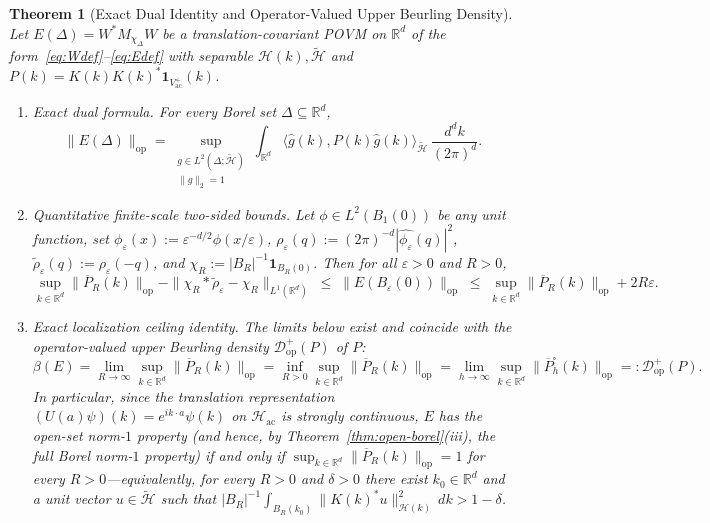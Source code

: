 \documentclass[11pt,a4paper]{article}
\newtheorem{theorem}{Theorem}[section]
\theoremstyle{definition}
\theoremstyle{remark}
\newcommand{\HH}{\mathcal{H}}
\newcommand{\tH}{\widetilde{\mathcal{H}}}
\newcommand{\RR}{\mathbb{R}}
\newcommand{\op}{\mathrm{op}}
\newcommand{\ac}{\mathrm{ac}}
\newcommand{\one}{\mathbf{1}}
\newcommand{\ip}[2]{\langle #1, #2 \rangle}
\newcommand{\norm}[1]{\|#1\|}
\begin{document}
\begin{theorem}[Exact Dual Identity and Operator-Valued Upper Beurling Density]\label{thm:beurling}
Let $E(\Delta)=W^* M_{\chi_\Delta} W$ be a translation-covariant POVM on $\RR^d$ of the form~\eqref{eq:Wdef}--\eqref{eq:Edef} with separable $\HH(k),\tH$ and $P(k)=K(k)K(k)^*\one_{V_\ac^+}(k)$.
\begin{enumerate}[label=\textup{(\roman*)},leftmargin=*]
\item \emph{Exact dual formula.} For every Borel set $\Delta\subseteq\RR^d$,
\begin{equation}\label{eq:dual}
\norm{E(\Delta)}_{\op} = \sup_{\substack{g\in L^2(\Delta;\tH)\\ \norm{g}_2=1}} \int_{\RR^d} \ip{\widehat{g}(k)}{P(k)\widehat{g}(k)}_{\tH}\,\frac{d^dk}{(2\pi)^d}.
\end{equation}
\item \emph{Quantitative finite-scale two-sided bounds.} Let $\phi\in L^2(B_1(0))$ be any unit function, set $\phi_\varepsilon(x):=\varepsilon^{-d/2}\phi(x/\varepsilon)$, $\rho_\varepsilon(q):=(2\pi)^{-d}|\widehat{\phi_\varepsilon}(q)|^2$, $\widetilde{\rho}_\varepsilon(q):=\rho_\varepsilon(-q)$, and $\chi_R := |B_R|^{-1}\one_{B_R(0)}$. Then for all $\varepsilon>0$ and $R>0$,
\begin{equation}\label{eq:sandwich}
\sup_{k\in\RR^d}\norm{\overline{P}_R(k)}_{\op} - \norm{\chi_R * \widetilde{\rho}_\varepsilon - \chi_R}_{L^1(\RR^d)}
\;\le\; \norm{E(B_\varepsilon(0))}_{\op}
\;\le\; \sup_{k\in\RR^d}\norm{\overline{P}_R(k)}_{\op} + 2R\varepsilon.
\end{equation}
\item \emph{Exact localization ceiling identity.} The limits below exist and coincide with the operator-valued upper Beurling density $\mathcal{D}_{\op}^+(P)$ of $P$:
\begin{equation}\label{eq:ceiling}
\beta(E) = \lim_{R\to\infty}\sup_{k\in\RR^d}\norm{\overline{P}_R(k)}_{\op}
= \inf_{R>0}\sup_{k\in\RR^d}\norm{\overline{P}_R(k)}_{\op}
= \lim_{h\to\infty}\sup_{k\in\RR^d}\norm{\overline{P}_h^{\square}(k)}_{\op}
=: \mathcal{D}_{\op}^+(P).
\end{equation}
In particular, since the translation representation $(U(a)\psi)(k)=e^{ik\cdot a}\psi(k)$ on $\HH_\ac$ is strongly continuous, $E$ has the open-set norm-$1$ property (and hence, by Theorem~\ref{thm:open-borel}(iii), the full Borel norm-$1$ property) if and only if $\sup_{k\in\RR^d}\norm{\overline{P}_R(k)}_{\op}=1$ for every $R>0$---equivalently, for every $R>0$ and $\delta>0$ there exist $k_0\in\RR^d$ and a unit vector $u\in\tH$ such that $|B_R|^{-1}\int_{B_R(k_0)} \norm{K(k)^*u}_{\HH(k)}^2\,dk > 1-\delta$.
\end{enumerate}
\end{theorem}
\end{document}
